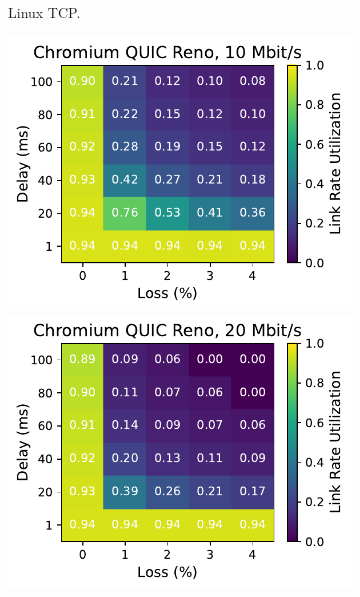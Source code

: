 \begin{figure}[ht]
\begin{subfigure}[b]{0.22\linewidth}
        \caption{Linux TCP.}
    \end{subfigure}
    \begin{subfigure}[b]{0.22\linewidth}
        \includegraphics[width=\linewidth,trim={0 0 2cm 0},clip]{figures/heatmaps/heatmap_quic_reno_10mbps.pdf}
        \includegraphics[width=\linewidth,trim={0 0 2cm 0},clip]{figures/heatmaps/heatmap_quic_reno_20mbps.pdf}

\end{subfigure}
\end{figure}
